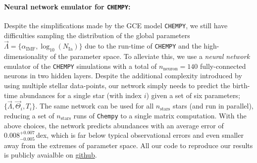 \documentclass{aa}
\begin{document}
\paragraph{Neural network emulator for \texttt{CHEMPY}:}
Despite the simplifications made by the GCE model \texttt{CHEMPY}, we still have difficulties sampling the distribution of the global parameters $\vec\Lambda = \{\alpha_\mathrm{IMF},\log_{10}(N_\mathrm{Ia})\}$ due to the run-time of \texttt{CHEMPY} and the high-dimensionality of the parameter space. To alleviate this, we use a \textit{neural network} emulator of the \texttt{CHEMPY} simulations with a total of $n_\mathrm{neuron}=140$ fully-connected neurons in two hidden layers.
%
%
Despite the additional complexity introduced by using multiple stellar data-points, our network simply needs to predict the birth-time abundances for a single star (with index $i$) given a set of six parameters; $\{\vec\Lambda,\vec\Theta_i,T_i\}$. The same network can be used for all $n_\mathrm{stars}$ stars (and run in parallel), reducing a set of $n_\mathrm{stars}$ runs of \texttt{Chempy} to a single matrix computation. With the above choices, the network predicts abundances with an average error of $0.008_{-0.005}^{+0.007}$\,dex, which is far below typical observational errors and even smaller away from the extremes of parameter space.
All our code to reproduce our results is publicly avaialble on \href{https://github.com/bGuenes/sbi_chemical_abundances}{github}.




\end{document}
